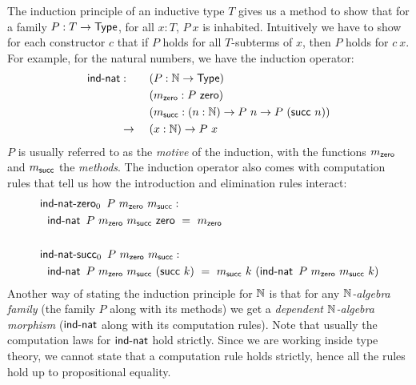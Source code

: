 \documentclass[a4paper,10pt]{report}
\begin{document}
The induction principle of an inductive type $T$ gives us a method to
show that for a family $P : T \to \mathsf{Type}$, for all $x : T$, $P\ x$ is
inhabited. Intuitively we have to show for each constructor $c$ that
if $P$ holds for all $T$-subterms of $x$, then $P$ holds for $c\
x$.
For example, for the natural numbers, we have the induction operator:
%
\begin{alignat*}{2}
  \indnat &:   &&\ (P : \Nat \to \Type) \\
          &    &&\ (m_{\zero} : P\ \zero) \\
          &    &&\ (m_{\suc} : (n : \Nat) \to P\ n \to P\ (\suc\ n)) \\
          &\to &&\ (x : \Nat) \to P\ x
\end{alignat*}
%
$P$ is usually referred to as the \emph{motive} of the induction, with
the functions $m_{\mathsf{zero}}$ and $m_{\mathsf{succ}}$ the \emph{methods}. The
induction operator also comes with computation rules that tell us how
the introduction and elimination rules interact:
%
\begin{align*}
  &\indnatzero_0\ P\ m_{\zero}\ m_{\suc} : \\
  &\ \ \indnat\ P\ m_{\zero}\ m_{\suc}\ \zero\ =\ m_{\zero} \\
  \\
  &\indnatsucc_0\ P\ m_{\zero}\ m_{\suc}  : \\
  &\ \ \indnat\ P\ m_{\zero}\ m_{\suc}\ (\suc\ k)\ =\ m_{\suc}\ k\ (\indnat\ P\ m_{\zero}\ m_{\suc}\ k)
\end{align*}
%
Another way of stating the induction principle for $\mathbb{N}$ is that for
any \emph{$\mathbb{N}$-algebra family} (the family $P$ along with its
methods) we get a \emph{dependent $\mathbb{N}$-algebra morphism} ($\operatorname{\mathsf{ind-nat}}$
along with its computation rules). Note that usually the computation
laws for $\operatorname{\mathsf{ind-nat}}$ hold strictly. Since we are working inside type
theory, we cannot state that a computation rule holds strictly, hence
all the rules hold up to propositional equality.
\end{document}
